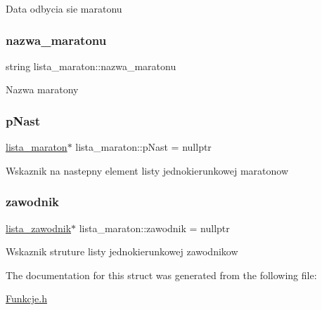 Data odbycia sie maratonu \mbox{\label{structlista__maraton_ab7ff5a8e5918e7a65ec9c40a3943c959}} 
\subsubsection{\texorpdfstring{nazwa\_maratonu}{nazwa\_maratonu}}
{\footnotesize\ttfamily string lista\+\_\+maraton\+::nazwa\+\_\+maratonu}

Nazwa maratony \mbox{\label{structlista__maraton_ac2d0360063ec23f4901fe84b92d886bf}} 
\subsubsection{\texorpdfstring{pNast}{pNast}}
{\footnotesize\ttfamily \mbox{\hyperlink{structlista__maraton}{lista\+\_\+maraton}}$\ast$ lista\+\_\+maraton\+::p\+Nast = nullptr}

Wskaznik na nastepny element listy jednokierunkowej maratonow \mbox{\label{structlista__maraton_a12fc36d25a15f51e84b57fc88965948f}} 
\subsubsection{\texorpdfstring{zawodnik}{zawodnik}}
{\footnotesize\ttfamily \mbox{\hyperlink{structlista__zawodnik}{lista\+\_\+zawodnik}}$\ast$ lista\+\_\+maraton\+::zawodnik = nullptr}

Wskaznik struture listy jednokierunkowej zawodnikow 

The documentation for this struct was generated from the following file\+:\begin{DoxyCompactItemize}
\item 
\mbox{\hyperlink{_funkcje_8h}{Funkcje.\+h}}\end{DoxyCompactItemize}
